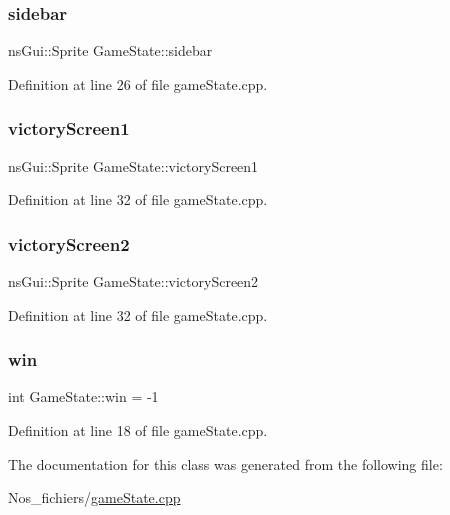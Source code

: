 \mbox{\label{class_game_state_a2e87890f9975c30f4c2bae9d6e05025f}} 
\subsubsection{\texorpdfstring{sidebar}{sidebar}}
{\footnotesize\ttfamily ns\+Gui\+::\+Sprite Game\+State\+::sidebar}



Definition at line 26 of file game\+State.\+cpp.

\mbox{\label{class_game_state_a82bb6889947656a95b7ea2ec9e50a9ac}} 
\subsubsection{\texorpdfstring{victory\+Screen1}{victoryScreen1}}
{\footnotesize\ttfamily ns\+Gui\+::\+Sprite Game\+State\+::victory\+Screen1}



Definition at line 32 of file game\+State.\+cpp.

\mbox{\label{class_game_state_abd3b617f8b2a9def4a1672d0c7a21235}} 
\subsubsection{\texorpdfstring{victory\+Screen2}{victoryScreen2}}
{\footnotesize\ttfamily ns\+Gui\+::\+Sprite Game\+State\+::victory\+Screen2}



Definition at line 32 of file game\+State.\+cpp.

\mbox{\label{class_game_state_ab09a030e2cf36e2a693560ea49ac130d}} 
\subsubsection{\texorpdfstring{win}{win}}
{\footnotesize\ttfamily int Game\+State\+::win = -\/1}



Definition at line 18 of file game\+State.\+cpp.



The documentation for this class was generated from the following file\+:\begin{DoxyCompactItemize}
\item 
Nos\+\_\+fichiers/\hyperlink{game_state_8cpp}{game\+State.\+cpp}\end{DoxyCompactItemize}
